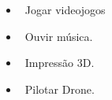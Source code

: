 

\begin{itemize}
	\item \faPlaystation \faXbox \faSteam ~Jogar videojogos \faGamepad
	\item \faSpotify ~Ouvir música.
	\item \faFingerprint ~Impressão 3D.
	\item \faRoute ~Pilotar Drone.
\end{itemize}